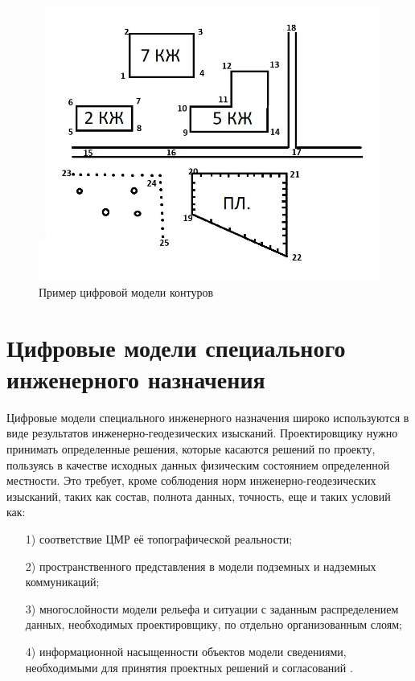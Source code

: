 \begin{figure}[h!]
    \center
    \includegraphics[scale=0.52]{images/1717.jpg}
    \caption{Пример цифровой модели контуров}
    \label{fig:5}
\end{figure}

\section{Цифровые модели специального инженерного назначения}

Цифровые модели специального инженерного назначения широко используются в виде результатов инженерно-геодезических изысканий. Проектировщику нужно принимать определенные решения, которые касаются решений по проекту, пользуясь в качестве исходных данных физическим состоянием определенной местности. Это требует, кроме соблюдения норм инженерно-геодезических изысканий, таких как состав, полнота данных, точность, еще и таких условий как: 

\begin{enumerate} 
  \item[1)] соответствие ЦМР её топографической реальности;
  \item[2)] пространственного представления в модели подземных и надземных коммуникаций;
  \item[3)] многослойности модели рельефа и ситуации с заданным распределением данных, необходимых проектировщику, по отдельно организованным слоям;
   \item[4)] информационной насыщенности объектов модели сведениями, необходимыми для принятия проектных решений и согласований \cite{22}.
\end{enumerate} 

